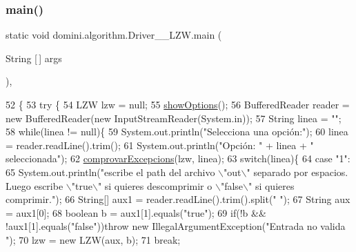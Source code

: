 \subsubsection{\texorpdfstring{main()}{main()}}
{\footnotesize\ttfamily static void domini.\+algorithm.\+Driver\+\_\+\+\_\+\+L\+Z\+W.\+main (\begin{DoxyParamCaption}\item[{String \mbox{[}$\,$\mbox{]}}]{args }\end{DoxyParamCaption})\hspace{0.3cm}{\ttfamily [inline]}, {\ttfamily [static]}}


\begin{DoxyCode}
52                                            \{
53     \textcolor{keywordflow}{try} \{
54         LZW lzw = null;
55         \hyperlink{classdomini_1_1algorithm_1_1Driver____LZW_ad43ebe1afd0d4e5be51584c71a1789d2}{showOptions}();
56         BufferedReader reader = \textcolor{keyword}{new} BufferedReader(\textcolor{keyword}{new} InputStreamReader(System.in));
57         String linea = \textcolor{stringliteral}{""};
58         \textcolor{keywordflow}{while}(linea != null)\{
59             System.out.println(\textcolor{stringliteral}{"Selecciona una opción:"});
60             linea = reader.readLine().trim();
61             System.out.println(\textcolor{stringliteral}{"Opción: "} + linea + \textcolor{stringliteral}{" seleccionada"});
62             \hyperlink{classdomini_1_1algorithm_1_1Driver____LZW_a3f609a2c3a22d0c7d11a5ff4e015e433}{comprovarExcepcions}(lzw, linea);
63             \textcolor{keywordflow}{switch}(linea)\{
64                 \textcolor{keywordflow}{case} \textcolor{stringliteral}{"1"}:
65                     System.out.println(\textcolor{stringliteral}{"escribe el path del archivo \(\backslash\)"out\(\backslash\)" separado por espacios. Luego
       escribe \(\backslash\)"true\(\backslash\)" si quieres descomprimir o \(\backslash\)"false\(\backslash\)" si quieres comprimir."});
66                     String[] aux1 = reader.readLine().trim().split(\textcolor{stringliteral}{" "});
67                     String aux = aux1[0];
68                     \textcolor{keywordtype}{boolean} b = aux1[1].equals(\textcolor{stringliteral}{"true"});
69                     \textcolor{keywordflow}{if}(!b && !aux1[1].equals(\textcolor{stringliteral}{"false"}))\textcolor{keywordflow}{throw} \textcolor{keyword}{new} IllegalArgumentException(\textcolor{stringliteral}{"Entrada no valida
      "});
70                     lzw = \textcolor{keyword}{new} LZW(aux, b);
71                 \textcolor{keywordflow}{break};

\end{DoxyCode}
